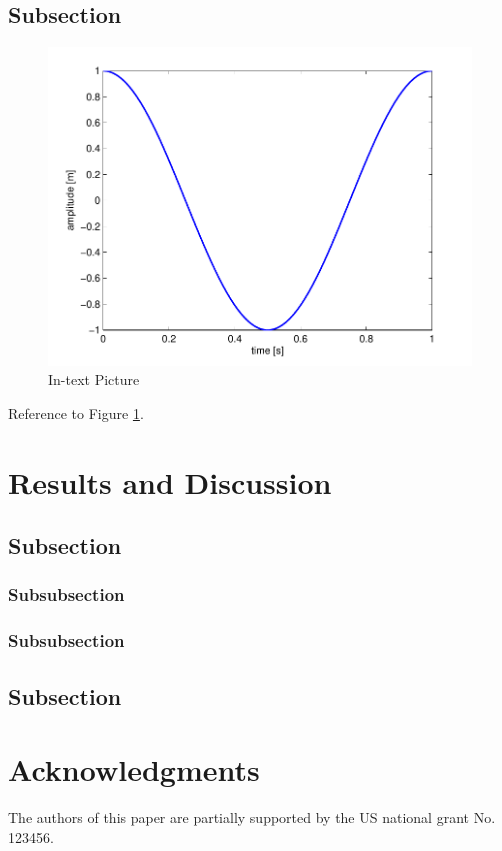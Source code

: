 \documentclass[fleqn,10pt]{ncc} %
\begin{document}
\subsection{Subsection}

\lipsum[9] %

\begin{figure}[ht]\centering
\includegraphics[width=\linewidth]{results}
\caption{In-text Picture}
\label{fig:results}
\end{figure}

Reference to Figure \ref{fig:results}.

\section{Results and Discussion}

\lipsum[10] %

\subsection{Subsection}

\lipsum[11] %

\subsubsection{Subsubsection}

\lipsum[12] %

\subsubsection{Subsubsection}

\lipsum[14] %

\subsection{Subsection}

\lipsum[15-20] %

\section*{Acknowledgments}

The authors of this paper are partially supported by the US national grant No. 123456.


\end{document}
